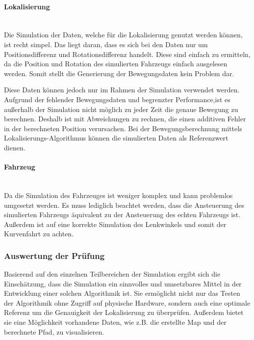 \paragraph{Lokalisierung} \mbox{}\\
Die Simulation der Daten, welche für die Lokalisierung genutzt werden können, ist recht simpel.
Das liegt daran, dass es sich bei den Daten nur um Positionsdifferenz und Rotationsdifferenz handelt.
Diese sind einfach zu ermitteln, da die Position und Rotation des simulierten Fahrzeugs einfach ausgelesen werden.
Somit stellt die Generierung der Bewegungsdaten kein Problem dar.

Diese Daten können jedoch nur im Rahmen der Simulation verwendet werden.
Aufgrund der fehlender Bewegungsdaten und begrenzter Performance,ist es außerhalb der Simulation nicht möglich zu jeder Zeit die genaue Bewegung zu berechnen. 
Deshalb ist mit Abweichungen zu rechnen, die einen additiven Fehler in der berechneten Position verursachen.
Bei der Bewegungsberechnung mittels Lokalisierungs-Algorithmus können die simulierten Daten als Referenzwert dienen.

\paragraph{Fahrzeug} \mbox{}\\
Da die Simulation des Fahrzeuges ist weniger komplex und kann problemlos umgesetzt werden.
Es muss lediglich beachtet werden, dass die Ansteuerung des simulierten Fahrzeugs äquivalent zu der Ansteuerung des echten Fahrzeugs ist.
Außerdem ist auf eine korrekte Simulation des Lenkwinkels und somit der Kurvenfahrt zu achten.

\subsubsection{Auswertung der Prüfung}
Basierend auf den einzelnen Teilbereichen der Simulation ergibt sich die Einschätzung, 
dass die Simulation ein sinnvolles und umsetzbares Mittel in der Entwicklung einer solchen Algorithmik ist.
Sie ermöglicht nicht nur das Testen der Algorithmik ohne Zugriff auf physische Hardware, 
sondern auch eine optimale Referenz um die Genauigkeit der Lokalisierung zu überprüfen.
Außerdem bietet sie eine Möglichkeit vorhandene Daten, wie z.B. die erstellte Map und der berechnete Pfad, zu visualisieren.
  
\newpage

